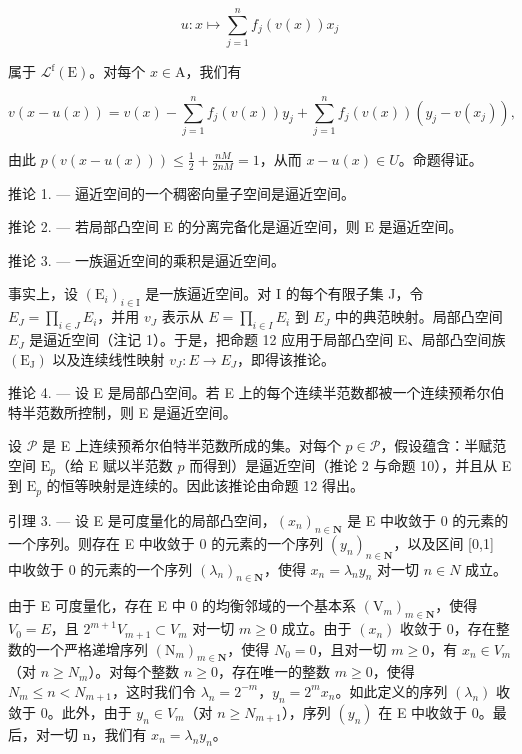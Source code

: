 \[
u \colon x \longmapsto \sum_ {j = 1} ^ {n} f _ {j} (v (x)) x _ {j}
\]

属于 \(\mathcal{L}^{\mathrm{f}}(\mathrm{E})\)。对每个 \(x\in \mathrm{A}\)，我们有

\[
v (x - u (x)) = v (x) - \sum_ {j = 1} ^ {n} f _ {j} (v (x)) y _ {j} + \sum_ {j = 1} ^ {n} f _ {j} (v (x)) \left(y _ {j} - v \left(x _ {j}\right)\right),
\]

由此 \(p(v(x - u(x))) \leqslant \frac{1}{2} + \frac{nM}{2nM} = 1\)，从而 \(x - u(x) \in U\)。命题得证。

推论 1. --- 逼近空间的一个稠密向量子空间是逼近空间。

推论 2. --- 若局部凸空间 E 的分离完备化是逼近空间，则 E 是逼近空间。

推论 3. --- 一族逼近空间的乘积是逼近空间。

事实上，设 \((\mathrm{E}_{i})_{i\in\mathrm{I}}\) 是一族逼近空间。对 I 的每个有限子集 J，令 \(E_{J}=\prod_{i\in J}E_{i}\)，并用 \(v_{J}\) 表示从 \(E=\prod_{i\in I}E_{i}\) 到 \(E_{J}\) 中的典范映射。局部凸空间 \(E_{J}\) 是逼近空间（注记 1）。于是，把命题 12 应用于局部凸空间 E、局部凸空间族 \((\mathrm{E}_{\mathrm{J}})\) 以及连续线性映射 \(v_{J}:E\to E_{J}\)，即得该推论。

推论 4. --- 设 E 是局部凸空间。若 E 上的每个连续半范数都被一个连续预希尔伯特半范数所控制，则 E 是逼近空间。

设 \(\mathcal{P}\) 是 E 上连续预希尔伯特半范数所成的集。对每个 \(p \in \mathcal{P}\)，假设蕴含：半赋范空间 \(\mathrm{E}_p\)（给 E 赋以半范数 \(p\) 而得到）是逼近空间（推论 2 与命题 10），并且从 E 到 \(\mathrm{E}_p\) 的恒等映射是连续的。因此该推论由命题 12 得出。

引理 3. --- 设 E 是可度量化的局部凸空间，\((x_{n})_{n\in\mathbf{N}}\) 是 E 中收敛于 0 的元素的一个序列。则存在 E 中收敛于 0 的元素的一个序列 \((y_{n})_{n\in\mathbf{N}}\)，以及区间 [0,1] 中收敛于 0 的元素的一个序列 \((\lambda_{n})_{n\in\mathbf{N}}\)，使得 \(x_{n}=\lambda_{n}y_{n}\) 对一切 \(n\in N\) 成立。

由于 E 可度量化，存在 E 中 0 的均衡邻域的一个基本系 \((\mathrm{V}_{m})_{m\in\mathbf{N}}\)，使得 \(V_{0}=E\)，且 \(2^{m+1}V_{m+1}\subset V_{m}\) 对一切 \(m\geqslant0\) 成立。由于 \((x_{n})\) 收敛于 0，存在整数的一个严格递增序列 \((\mathrm{N}_{m})_{m\in\mathbf{N}}\)，使得 \(N_{0}=0\)，且对一切 \(m\geqslant0\)，有 \(x_{n}\in V_{m}\)（对 \(n\geqslant N_{m}\)）。对每个整数 \(n\geqslant0\)，存在唯一的整数 \(m\geqslant0\)，使得 \(N_{m}\leqslant n<N_{m+1}\)，这时我们令 \(\lambda_{n}=2^{-m}\)，\(y_{n}=2^{m}x_{n}\)。如此定义的序列 \((\lambda_{n})\) 收敛于 0。此外，由于 \(y_{n}\in V_{m}\)（对 \(n\geqslant N_{m+1}\)），序列 \((y_{n})\) 在 E 中收敛于 0。最后，对一切 n，我们有 \(x_{n}=\lambda_{n}y_{n}\)。

